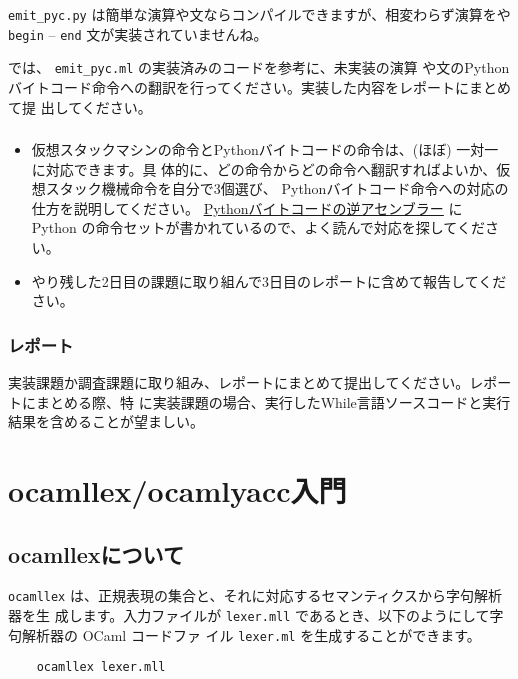 \documentclass[a4paper,11pt]{jsarticle}
\begin{document}
\verb|emit_pyc.py| は簡単な演算や文ならコンパイルできますが、相変わらず演算をや \verb|begin| --
\verb|end| 文が実装されていませんね。

では、 \verb|emit_pyc.ml| の実装済みのコードを参考に、未実装の演算
や文のPythonバイトコード命令への翻訳を行ってください。実装した内容をレポートにまとめて提
出してください。

\subsubsection{}

\begin{itemize}
\item 仮想スタックマシンの命令とPythonバイトコードの命令は、(ほぼ) 一対一に対応できます。具
  体的に、どの命令からどの命令へ翻訳すればよいか、仮想スタック機械命令を自分で3個選び、
  Pythonバイトコード命令への対応の仕方を説明してください。
  \href{https://docs.python.org/ja/3/library/dis.html}{Pythonバイトコードの逆アセンブラー}
  に Python の命令セットが書かれているので、よく読んで対応を探してください。
\item やり残した2日目の課題に取り組んで3日目のレポートに含めて報告してください。
\end{itemize}

\subsubsection{レポート}

実装課題か調査課題に取り組み、レポートにまとめて提出してください。レポートにまとめる際、特
に実装課題の場合、実行したWhile言語ソースコードと実行結果を含めることが望ましい。

\newpage
\section{ocamllex/ocamlyacc入門}
\label{intro_lex_yacc}

\subsection{ocamllexについて}

\verb|ocamllex| は、正規表現の集合と、それに対応するセマンティクスから字句解析器を生
成します。入力ファイルが \verb|lexer.mll| であるとき、以下のようにして字句解析器の OCaml
コードファ イル \verb|lexer.ml| を生成することができます。

\begin{lstlisting}
    ocamllex lexer.mll
\end{lstlisting}
\end{document}
